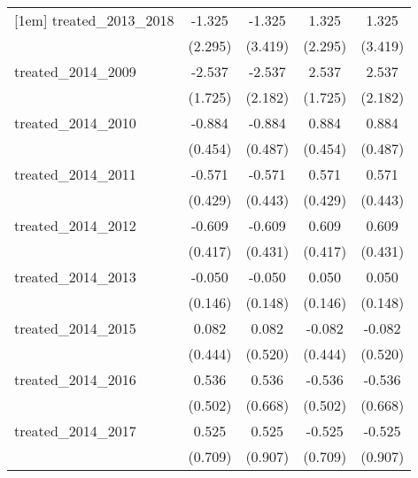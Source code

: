 {\begin{tabular}{l*{4}{c}}
[1em]
treated\_2013\_2018&      -1.325         &      -1.325         &       1.325         &       1.325         \\
            &     (2.295)         &     (3.419)         &     (2.295)         &     (3.419)         \\
[1em]
treated\_2014\_2009&      -2.537         &      -2.537         &       2.537         &       2.537         \\
            &     (1.725)         &     (2.182)         &     (1.725)         &     (2.182)         \\
[1em]
treated\_2014\_2010&      -0.884         &      -0.884         &       0.884         &       0.884         \\
            &     (0.454)         &     (0.487)         &     (0.454)         &     (0.487)         \\
[1em]
treated\_2014\_2011&      -0.571         &      -0.571         &       0.571         &       0.571         \\
            &     (0.429)         &     (0.443)         &     (0.429)         &     (0.443)         \\
[1em]
treated\_2014\_2012&      -0.609         &      -0.609         &       0.609         &       0.609         \\
            &     (0.417)         &     (0.431)         &     (0.417)         &     (0.431)         \\
[1em]
treated\_2014\_2013&      -0.050         &      -0.050         &       0.050         &       0.050         \\
            &     (0.146)         &     (0.148)         &     (0.146)         &     (0.148)         \\
[1em]
treated\_2014\_2015&       0.082         &       0.082         &      -0.082         &      -0.082         \\
            &     (0.444)         &     (0.520)         &     (0.444)         &     (0.520)         \\
[1em]
treated\_2014\_2016&       0.536         &       0.536         &      -0.536         &      -0.536         \\
            &     (0.502)         &     (0.668)         &     (0.502)         &     (0.668)         \\
[1em]
treated\_2014\_2017&       0.525         &       0.525         &      -0.525         &      -0.525         \\
            &     (0.709)         &     (0.907)         &     (0.709)         &     (0.907)         \\

\end{tabular}}
